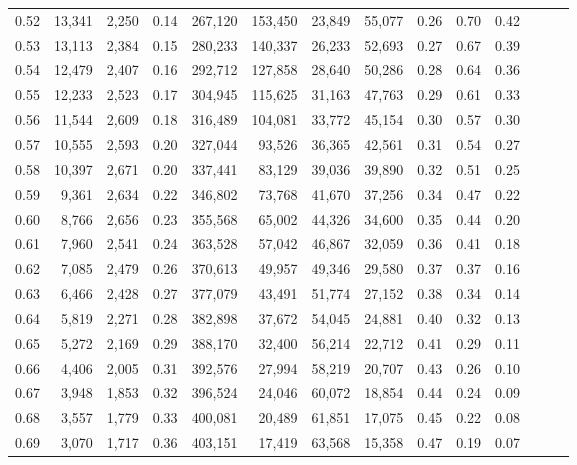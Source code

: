 \begin{tabular}{rrrrrrrrrrrrrr}
0.52 &  13,341 &  2,250 &  0.14 &  267,120 &  153,450 &  23,849 &  55,077 &  0.26 &  0.70 &      0.42 \\
0.53 &  13,113 &  2,384 &  0.15 &  280,233 &  140,337 &  26,233 &  52,693 &  0.27 &  0.67 &      0.39 \\
0.54 &  12,479 &  2,407 &  0.16 &  292,712 &  127,858 &  28,640 &  50,286 &  0.28 &  0.64 &      0.36 \\
0.55 &  12,233 &  2,523 &  0.17 &  304,945 &  115,625 &  31,163 &  47,763 &  0.29 &  0.61 &      0.33 \\
0.56 &  11,544 &  2,609 &  0.18 &  316,489 &  104,081 &  33,772 &  45,154 &  0.30 &  0.57 &      0.30 \\
0.57 &  10,555 &  2,593 &  0.20 &  327,044 &   93,526 &  36,365 &  42,561 &  0.31 &  0.54 &      0.27 \\
0.58 &  10,397 &  2,671 &  0.20 &  337,441 &   83,129 &  39,036 &  39,890 &  0.32 &  0.51 &      0.25 \\
0.59 &   9,361 &  2,634 &  0.22 &  346,802 &   73,768 &  41,670 &  37,256 &  0.34 &  0.47 &      0.22 \\
0.60 &   8,766 &  2,656 &  0.23 &  355,568 &   65,002 &  44,326 &  34,600 &  0.35 &  0.44 &      0.20 \\
0.61 &   7,960 &  2,541 &  0.24 &  363,528 &   57,042 &  46,867 &  32,059 &  0.36 &  0.41 &      0.18 \\
0.62 &   7,085 &  2,479 &  0.26 &  370,613 &   49,957 &  49,346 &  29,580 &  0.37 &  0.37 &      0.16 \\
0.63 &   6,466 &  2,428 &  0.27 &  377,079 &   43,491 &  51,774 &  27,152 &  0.38 &  0.34 &      0.14 \\
0.64 &   5,819 &  2,271 &  0.28 &  382,898 &   37,672 &  54,045 &  24,881 &  0.40 &  0.32 &      0.13 \\
0.65 &   5,272 &  2,169 &  0.29 &  388,170 &   32,400 &  56,214 &  22,712 &  0.41 &  0.29 &      0.11 \\
0.66 &   4,406 &  2,005 &  0.31 &  392,576 &   27,994 &  58,219 &  20,707 &  0.43 &  0.26 &      0.10 \\
0.67 &   3,948 &  1,853 &  0.32 &  396,524 &   24,046 &  60,072 &  18,854 &  0.44 &  0.24 &      0.09 \\
0.68 &   3,557 &  1,779 &  0.33 &  400,081 &   20,489 &  61,851 &  17,075 &  0.45 &  0.22 &      0.08 \\
0.69 &   3,070 &  1,717 &  0.36 &  403,151 &   17,419 &  63,568 &  15,358 &  0.47 &  0.19 &      0.07 \\

\end{tabular}
